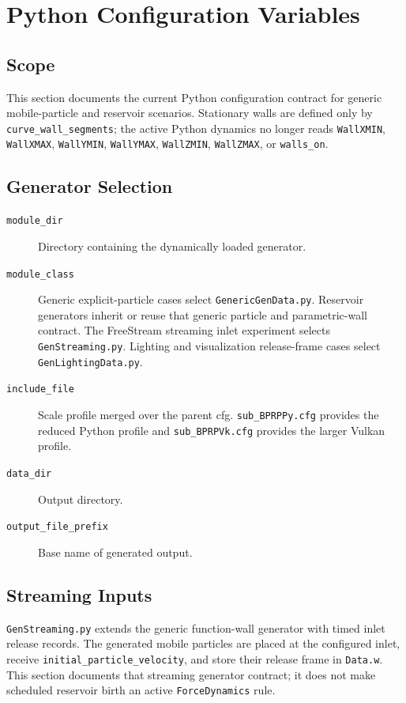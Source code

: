 \section{Python Configuration Variables}

\subsection{Scope}

This section documents the current Python configuration contract for generic
mobile-particle and reservoir scenarios.  Stationary walls are defined only
by \texttt{curve\_wall\_segments}; the active Python dynamics no longer reads
\texttt{WallXMIN}, \texttt{WallXMAX}, \texttt{WallYMIN},
\texttt{WallYMAX}, \texttt{WallZMIN}, \texttt{WallZMAX}, or
\texttt{walls\_on}.

\subsection{Generator Selection}

\begin{description}
    \item[\texttt{module\_dir}] Directory containing the dynamically loaded
    generator.
    \item[\texttt{module\_class}] Generic explicit-particle cases select
    \texttt{GenericGenData.py}.  Reservoir generators inherit or reuse that
    generic particle and parametric-wall contract.  The FreeStream streaming
    inlet experiment selects \texttt{GenStreaming.py}.  Lighting and
    visualization release-frame cases select \texttt{GenLightingData.py}.
    \item[\texttt{include\_file}] Scale profile merged over the parent cfg.
    \texttt{sub\_BPRPPy.cfg} provides the reduced Python profile and
    \texttt{sub\_BPRPVk.cfg} provides the larger Vulkan profile.
    \item[\texttt{data\_dir}] Output directory.
    \item[\texttt{output\_file\_prefix}] Base name of generated output.
\end{description}

\subsection{Streaming Inputs}

\texttt{GenStreaming.py} extends the generic function-wall generator with
timed inlet release records.  The generated mobile particles are placed at
the configured inlet, receive \texttt{initial\_particle\_velocity}, and store
their release frame in \texttt{Data.w}.  This section documents that
streaming generator contract; it does not make scheduled reservoir birth an
active \texttt{ForceDynamics} rule.

